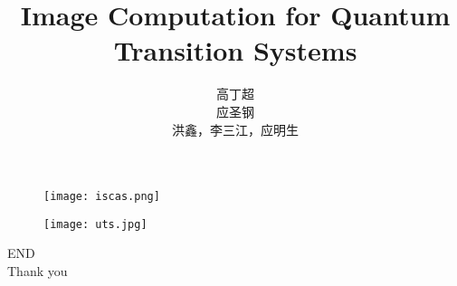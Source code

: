 \documentclass[aspectratio=1610]{ctexbeamer}
\title[TDD in quantum]{Image Computation for Quantum Transition Systems}
\author[Gcc]{高丁超\\ 应圣钢\\洪鑫，李三江，应明生}
\begin{document}
\begin{frame}[plain]
  \titlepage
  \begin{figure}
    \centering
    \begin{minipage}[t]{0.48\textwidth}
    \centering
    \texttt{[image: iscas.png]}
    \end{minipage}
    \begin{minipage}[t]{0.48\textwidth}
    \centering
    \texttt{[image: uts.jpg]}
    \end{minipage}
  \end{figure}
\end{frame}

\begin{frame}
\centering
\Huge{END\\Thank you}
\end{frame}
\end{document}
